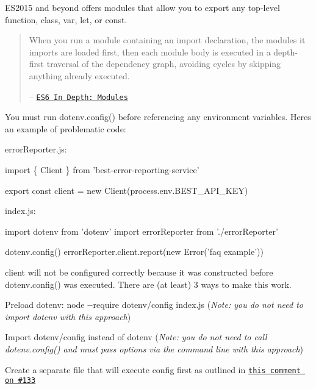 E\+S2015 and beyond offers modules that allow you to {\ttfamily export} any top-\/level {\ttfamily function}, {\ttfamily class}, {\ttfamily var}, {\ttfamily let}, or {\ttfamily const}.

\begin{quote}
When you run a module containing an {\ttfamily import} declaration, the modules it imports are loaded first, then each module body is executed in a depth-\/first traversal of the dependency graph, avoiding cycles by skipping anything already executed.

– \href{https://hacks.mozilla.org/2015/08/es6-in-depth-modules/}{\tt E\+S6 In Depth\+: Modules} \end{quote}


You must run {\ttfamily dotenv.\+config()} before referencing any environment variables. Here\textquotesingle{}s an example of problematic code\+:

{\ttfamily error\+Reporter.\+js}\+:


\begin{DoxyCode}
import \{ Client \} from 'best-error-reporting-service'

export const client = new Client(process.env.BEST\_API\_KEY)
\end{DoxyCode}


{\ttfamily index.\+js}\+:


\begin{DoxyCode}
import dotenv from 'dotenv'
import errorReporter from './errorReporter'

dotenv.config()
errorReporter.client.report(new Error('faq example'))
\end{DoxyCode}


{\ttfamily client} will not be configured correctly because it was constructed before {\ttfamily dotenv.\+config()} was executed. There are (at least) 3 ways to make this work.


\begin{DoxyEnumerate}
\item Preload dotenv\+: {\ttfamily node -\/-\/require dotenv/config index.\+js} ({\itshape Note\+: you do not need to {\ttfamily import} dotenv with this approach})
\item Import {\ttfamily dotenv/config} instead of {\ttfamily dotenv} ({\itshape Note\+: you do not need to call {\ttfamily dotenv.\+config()} and must pass options via the command line with this approach})
\item Create a separate file that will execute {\ttfamily config} first as outlined in \href{https://github.com/motdotla/dotenv/issues/133#issuecomment-255298822}{\tt this comment on \#133}
\end{DoxyEnumerate}

